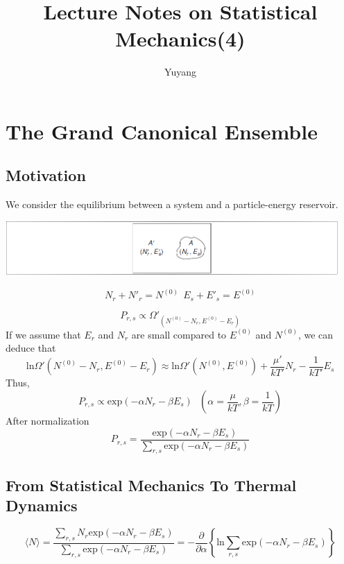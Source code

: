 \documentclass{article}
\title{Lecture Notes on Statistical Mechanics(4)}
\author{Yuyang}
\begin{document}
\maketitle
\section{The Grand Canonical Ensemble}
\subsection{Motivation}
We consider the equilibrium between a system and a particle-energy reservoir.
\begin{center}     
\includegraphics[width=5in]{1.PNG}  
\end{center}

\begin{equation}
N_r+N'_r=N^{(0)} \ \  E_s+E'_s=E^{(0)}
\end{equation}

\begin{equation}
P_{r,s} \propto \Omega'_(N^{(0)}-N_r,E^{(0)}-E_r)
\end{equation}
If we assume that $E_r$ and $N_r$ are small compared to $E^{(0)}$ and $N^{(0)}$, we can deduce that
\begin{equation}
\mathrm{ln}\Omega'(N^{(0)}-N_r,E^{(0)}-E_r) \approx \mathrm{ln}\Omega'(N^{(0)},E^{(0)}) + \frac{\mu'}{kT'}N_r-\frac{1}{kT'}E_s 
\end{equation} 
Thus,
\begin{equation}
P_{r,s} \propto \mathrm{exp}(-\alpha N_r-\beta E_s) \  \ \ (\alpha=\frac{\mu}{kT} , \beta=\frac{1}{kT})
\end{equation}
After normalization
\begin{equation}
P_{r,s}=\frac{\mathrm{exp}(-\alpha N_r-\beta E_s)}{\sum_{r,s} \mathrm{exp}(-\alpha N_r-\beta E_s)}
\end{equation}

\subsection{From Statistical Mechanics To Thermal Dynamics}
\begin{equation}
\langle N \rangle =\frac{\sum_{r,s} N_r \mathrm{exp}(-\alpha N_r-\beta E_s) }{\sum_{r,s} \mathrm{exp}(-\alpha N_r-\beta E_s)} = -\frac{\partial}{\partial \alpha} \left\{ \mathrm{ln}\sum_{r,s} \mathrm{exp}(-\alpha N_r-\beta E_s) \right \}
\end{equation}
\end{document}
